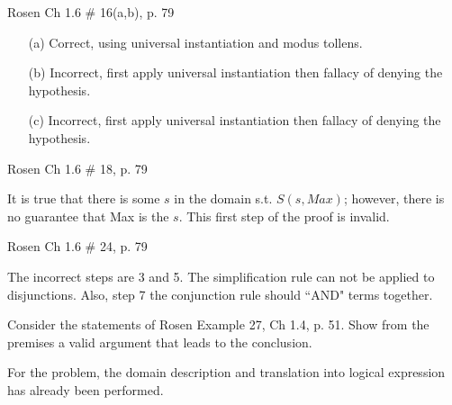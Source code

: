 \begin{questions}
 Rosen Ch 1.6 \# 16(a,b), p. 79
    \ifprintanswers
        \vspace{-15pt}
    \fi
\begin{solution}
    \begin{itemize}[itemsep=0pt,parsep=0pt,topsep=0pt,partopsep=0pt]
        \item[(a)] Correct, using universal instantiation and modus tollens.
        \item[(b)] Incorrect, first apply universal instantiation then fallacy of denying the hypothesis.
        \item[(c)] Incorrect, first apply universal instantiation then fallacy of denying the hypothesis.
    \end{itemize}
\end{solution}




 Rosen Ch 1.6 \# 18, p. 79
    \ifprintanswers
        \vspace{-15pt}
    \fi
\begin{solution}
    It is true that there is some $s$ in the domain s.t. $S(s,Max)$; however, there is no guarantee that Max is the $s$.  This first step of the proof is invalid.
\end{solution}



 Rosen Ch 1.6 \# 24, p. 79
    \ifprintanswers
        \vspace{-15pt}
    \fi
\begin{solution}
    The incorrect steps are 3 and 5.  The simplification rule can not be applied to disjunctions.  Also, step 7 the conjunction rule should ``AND" terms together.
\end{solution}



 Consider the statements of Rosen Example 27, Ch 1.4, p. 51.  Show from the premises a valid argument that leads to the conclusion.
    \ifprintanswers
        \vspace{-10pt}
    \fi
\begin{solution}
    For the problem, the domain description and translation into logical expression has already been performed.


\end{solution}
\end{questions}
